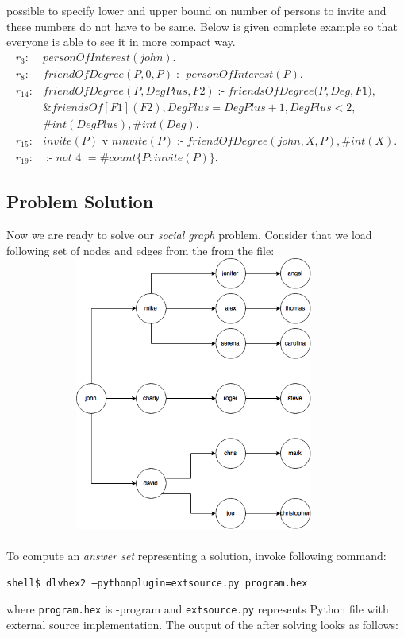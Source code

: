 \documentclass[14pt,a4paper, titlepage]{article}
\newcommand{\ext}[3]{\ensuremath{\&{#1}[#2](#3)}}
\DeclareMathOperator{\leftimpl}{:-}
\begin{document}
possible to specify lower and upper bound on number of persons to invite and these numbers do not 
have to be same. Below is given complete example so that everyone is able to see it in more compact way.
\begin{align*}
r_3\colon& \mathit{personOfInterest}(\mathit{john}).\\
r_8\colon& \mathit{friendOfDegree}(\mathit{P, 0, P}) \leftimpl \mathit{personOfInterest}(P).\\
r_{14}\colon& \mathit{friendOfDegree}(\mathit{P, DegPlus, F2}) \leftimpl \mathit{friendsOfDegree}(\mathit{P,Deg,F1)},\\
& \ext{friendsOf}{F1}{F2}, \mathit{DegPlus = DegPlus + 1}, \mathit{DegPlus < 2},\\
& \mathit{\#int(DegPlus)}, \mathit{\#int(Deg)}.\\
r_{15}\colon& \mathit{invite(P)} \text{ v } \mathit{ninvite(P) \leftimpl friendOfDegree(john,X,P), \#int(X).}\\
r_{19}\colon& \leftimpl \mathit{not} \text{ 4 } = \mathit{\#count} \{ P : \mathit{invite(P)} \}.
\end{align*}  

\subsection{Problem Solution}
Now we are ready to solve our \emph{social graph} problem. Consider that we load following set of nodes and edges from the from the file:\\
\includegraphics[width=12.5cm,height=9cm]{graph}
\\ \\To compute an \emph{answer set} representing 
a solution, invoke following command:
\\ \centerline{\texttt{shell\$ dlvhex2 --pythonplugin=extsource.py program.hex}}
where \texttt{program.hex} is \hex-program and \texttt{extsource.py} represents Python file with 
external source implementation. The output of the \dlvhex{} after solving looks as follows:
\end{document}
